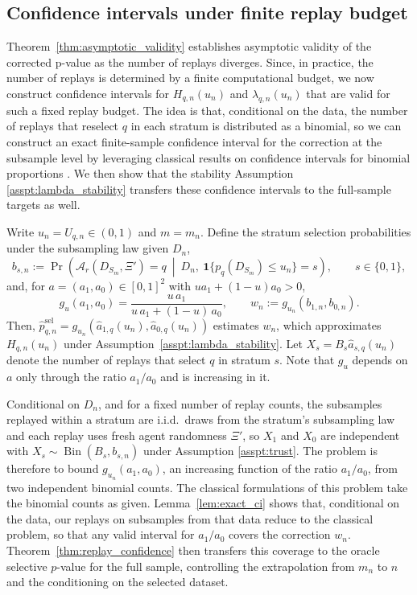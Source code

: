 \documentclass[10pt]{article}
\begin{document}
\subsection{Confidence intervals under finite replay budget}
\label{sec:replay_uncertainty}
Theorem~\ref{thm:asymptotic_validity} establishes asymptotic validity of the corrected p-value as the number of replays diverges. Since, in practice, the number of replays is determined by a finite computational budget, we now construct confidence intervals for $H_{q,n}(u_n)$ and $\lambda_{q,n}(u_n)$ that are valid for such a fixed replay budget. The idea is that, conditional on the data, the number of replays that reselect $q$ in each stratum is distributed as a binomial, so we can construct an exact finite-sample confidence interval for the correction at the subsample level by leveraging classical results on confidence intervals for binomial proportions \citep{clopper1934use, berger1994p}. We then show that the stability Assumption \ref{asspt:lambda_stability} transfers these confidence intervals to the full-sample targets as well.

Write $u_n=U_{q,n}\in(0,1)$ and $m=m_n$. Define the stratum selection probabilities under the subsampling law given $D_n$,
\[
b_{s,n}:=\Pr\!\left(\mathcal A_r(D_{S_m},\Xi')=q\ \middle|\ D_n,\ \mathbf 1\{p_q(D_{S_m})\le u_n\}=s\right),
\qquad s\in\{0,1\},
\]
and, for $a=(a_1,a_0)\in[0,1]^2$ with $ua_1+(1-u)a_0>0$,
\[
g_u(a_1,a_0)=\frac{u\,a_1}{u\,a_1+(1-u)\,a_0},
\qquad
w_n:=g_{u_n}(b_{1,n},b_{0,n}).
\]
Then, $\widehat p^{\mathrm{sel}}_{q,n}=g_{u_n}(\widehat a_{1,q}(u_n),\widehat a_{0,q}(u_n))$ estimates $w_n$, which approximates $H_{q,n}(u_n)$ under Assumption~\ref{asspt:lambda_stability}. Let $X_s=B_s\widehat a_{s,q}(u_n)$ denote the number of replays that select $q$ in stratum $s$. Note that $g_u$ depends on $a$ only through the ratio $a_1/a_0$ and is increasing in it.

Conditional on $D_n$, and for a fixed number of replay counts, the subsamples replayed within a stratum are i.i.d.\ draws from the stratum's subsampling law and each replay uses fresh agent randomness $\Xi'$, so $X_1$ and $X_0$ are independent with $X_s\sim\operatorname{Bin}(B_s,b_{s,n})$ under Assumption \ref{asspt:trust}. The problem is therefore to bound $g_{u_n}(a_1,a_0)$, an increasing function of the ratio $a_1/a_0$, from two independent binomial counts. The classical formulations of this problem \citep{chan1999test, agresti2001small, fay2021practical} take the binomial counts as given. Lemma~\ref{lem:exact_ci} shows that, conditional on the data, our replays on subsamples from that data reduce to the classical problem, so that any valid interval for $a_1/a_0$ covers the correction $w_n$. Theorem~\ref{thm:replay_confidence} then transfers this coverage to the oracle selective $p$-value for the full sample, controlling the extrapolation from $m_n$ to $n$ and the conditioning on the selected dataset.
\end{document}

